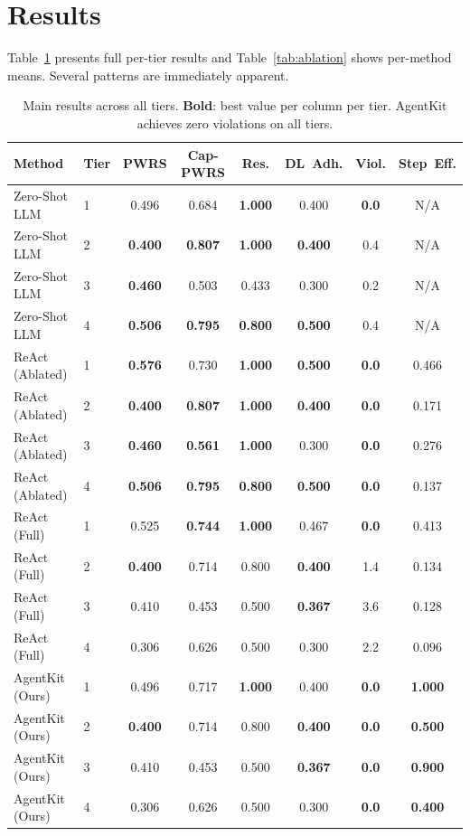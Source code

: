 \documentclass{article}
\begin{document}
\section{Results}
\label{sec:results}

Table~\ref{tab:main} presents full per-tier results and Table~\ref{tab:ablation}
shows per-method means. Several patterns are immediately apparent.

\begin{table}[t]
\centering
\caption{Main results across all tiers. \textbf{Bold}: best value per column per tier.
  AgentKit achieves zero violations on all tiers.}
\label{tab:main}
\footnotesize
\renewcommand{\arraystretch}{1.05}
\begin{tabular}{llcccccc}
\toprule
\textbf{Method} & \textbf{Tier} & \textbf{PWRS} & \textbf{Cap-PWRS} & \textbf{Res.} & \textbf{DL~Adh.} & \textbf{Viol.} & \textbf{Step~Eff.} \\
\midrule
Zero-Shot LLM    & 1 & 0.496 & 0.684 & \textbf{1.000} & 0.400 & \textbf{0.0} & N/A \\
Zero-Shot LLM    & 2 & \textbf{0.400} & \textbf{0.807} & \textbf{1.000} & \textbf{0.400} & 0.4 & N/A \\
Zero-Shot LLM    & 3 & \textbf{0.460} & 0.503 & 0.433 & 0.300 & 0.2 & N/A \\
Zero-Shot LLM    & 4 & \textbf{0.506} & \textbf{0.795} & \textbf{0.800} & \textbf{0.500} & 0.4 & N/A \\
\midrule
ReAct (Ablated)  & 1 & \textbf{0.576} & 0.730 & \textbf{1.000} & \textbf{0.500} & \textbf{0.0} & 0.466 \\
ReAct (Ablated)  & 2 & \textbf{0.400} & \textbf{0.807} & \textbf{1.000} & \textbf{0.400} & \textbf{0.0} & 0.171 \\
ReAct (Ablated)  & 3 & \textbf{0.460} & \textbf{0.561} & \textbf{1.000} & 0.300 & \textbf{0.0} & 0.276 \\
ReAct (Ablated)  & 4 & \textbf{0.506} & \textbf{0.795} & \textbf{0.800} & \textbf{0.500} & \textbf{0.0} & 0.137 \\
\midrule
ReAct (Full)     & 1 & 0.525 & \textbf{0.744} & \textbf{1.000} & 0.467 & \textbf{0.0} & 0.413 \\
ReAct (Full)     & 2 & \textbf{0.400} & 0.714 & 0.800 & \textbf{0.400} & 1.4 & 0.134 \\
ReAct (Full)     & 3 & 0.410 & 0.453 & 0.500 & \textbf{0.367} & 3.6 & 0.128 \\
ReAct (Full)     & 4 & 0.306 & 0.626 & 0.500 & 0.300 & 2.2 & 0.096 \\
\midrule
AgentKit (Ours)  & 1 & 0.496 & 0.717 & \textbf{1.000} & 0.400 & \textbf{0.0} & \textbf{1.000} \\
AgentKit (Ours)  & 2 & \textbf{0.400} & 0.714 & 0.800 & \textbf{0.400} & \textbf{0.0} & \textbf{0.500} \\
AgentKit (Ours)  & 3 & 0.410 & 0.453 & 0.500 & \textbf{0.367} & \textbf{0.0} & \textbf{0.900} \\
AgentKit (Ours)  & 4 & 0.306 & 0.626 & 0.500 & 0.300 & \textbf{0.0} & \textbf{0.400} \\
\bottomrule
\end{tabular}
\end{table}
\end{document}
